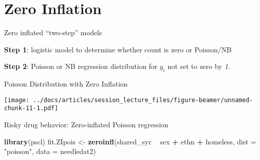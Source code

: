 \documentclass[
  ignorenonframetext,
]{beamer}
\newenvironment{Shaded}{\begin{snugshade}}{\end{snugshade}}
\newcommand{\DataTypeTok}[1]{\textcolor[rgb]{0.13,0.29,0.53}{#1}}
\newcommand{\KeywordTok}[1]{\textcolor[rgb]{0.13,0.29,0.53}{\textbf{#1}}}
\newcommand{\NormalTok}[1]{#1}
\newcommand{\OperatorTok}[1]{\textcolor[rgb]{0.81,0.36,0.00}{\textbf{#1}}}
\newcommand{\StringTok}[1]{\textcolor[rgb]{0.31,0.60,0.02}{#1}}
\begin{document}
\hypertarget{zero-inflation}{%
\section{Zero Inflation}\label{zero-inflation}}

\begin{frame}{Zero inflated ``two-step'' models}
\protect\hypertarget{zero-inflated-two-step-models}{}

\textbf{Step 1}: logistic model to determine whether count is zero or
Poisson/NB

\textbf{Step 2}: Poisson or NB regression distribution for \(y_i\) not
set to zero by \emph{1.}

\end{frame}

\begin{frame}{Poisson Distribution with Zero Inflation}
\protect\hypertarget{poisson-distribution-with-zero-inflation}{}

\texttt{[image: ../docs/articles/session\_lecture\_files/figure-beamer/unnamed-chunk-11-1.pdf]}

\end{frame}

\begin{frame}[fragile]{Risky drug behavior: Zero-inflated Poisson
regression}
\protect\hypertarget{risky-drug-behavior-zero-inflated-poisson-regression}{}

\begin{Shaded}
\begin{Highlighting}[]
\KeywordTok{library}\NormalTok{(pscl)}
\NormalTok{fit.ZIpois <-}\StringTok{ }\KeywordTok{zeroinfl}\NormalTok{(shared_syr }\OperatorTok{~}\StringTok{ }\NormalTok{sex }\OperatorTok{+}\StringTok{ }\NormalTok{ethn }\OperatorTok{+}\StringTok{ }\NormalTok{homeless,}
                       \DataTypeTok{dist =} \StringTok{"poisson"}\NormalTok{,}
                       \DataTypeTok{data =}\NormalTok{ needledat2)}
\end{Highlighting}
\end{Shaded}

\end{frame}
\end{document}

